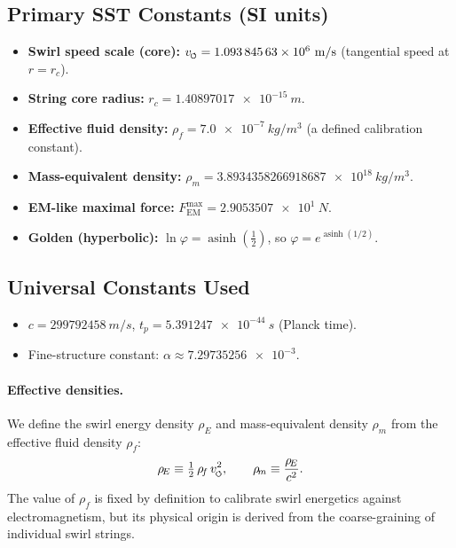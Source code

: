 \documentclass[11pt]{article}
\newcommand{\swirlarrow}{%
    \mathchoice{\mkern-2mu\scriptstyle\boldsymbol{\circlearrowleft}}%
    {\mkern-2mu\scriptstyle\boldsymbol{\circlearrowleft}}%
    {\mkern-2mu\scriptscriptstyle\boldsymbol{\circlearrowleft}}%
    {\mkern-2mu\scriptscriptstyle\boldsymbol{\circlearrowleft}}%
}
\newcommand{\vscore}{v_{\swirlarrow}}                    %
\newcommand{\rhof}{\rho_{\!f}}                           %
\newcommand{\rhoE}{\rho_{\!E}}                           %
\newcommand{\rhom}{\rho_{\!m}}                           %
\newcommand{\rc}{r_c}                                    %
\newcommand{\FmaxEM}{F_{\mathrm{EM}}^{\max}}             %
\begin{document}
    \subsection*{Primary SST Constants (SI units)}
        \begin{itemize}
        \item \textbf{Swirl speed scale (core):} $\vscore = \num{1.09384563e6}\ \si{m/s}$ (tangential speed at $r=\rc$).
        \item \textbf{String core radius:} $\rc = \num{1.40897017e-15}\ \si{m}$.
        \item \textbf{Effective fluid density:} $\rhof = \num{7.0e-7}\ \si{kg/m^3}$ (a defined calibration constant).
        \item \textbf{Mass-equivalent density:} $\rhom = \num{3.8934358266918687e18}\ \si{kg/m^3}$.
        \item \textbf{EM-like maximal force:} $\FmaxEM = \num{2.9053507e1}\ \si{N}$.
        \item \textbf{Golden (hyperbolic):} $\ln\varphi=\operatorname{asinh}\!\left(\tfrac12\right)$, so $\varphi=e^{\operatorname{asinh}(1/2)}$.
        \end{itemize}

    \subsection*{Universal Constants Used}
        \begin{itemize}
        \item $c=\num{299792458}\ \si{m/s}$, \quad $t_p=\num{5.391247e-44}\ \si{s}$ (Planck time).
        \item Fine-structure constant: $\alpha \approx \num{7.29735256e-3}$.
        \end{itemize}

        \paragraph{Effective densities.} We define the swirl energy density $\rhoE$ and mass-equivalent density $\rhom$ from the effective fluid density $\rhof$:
            \[
                \rhoE \equiv \tfrac{1}{2}\,\rhof\,\vscore^2, \qquad
                \rhom \equiv \frac{\rhoE}{c^2}.
            \]
            The value of $\rhof$ is fixed by definition to calibrate swirl energetics against electromagnetism, but its physical origin is derived from the coarse-graining of individual swirl strings.
\end{document}
